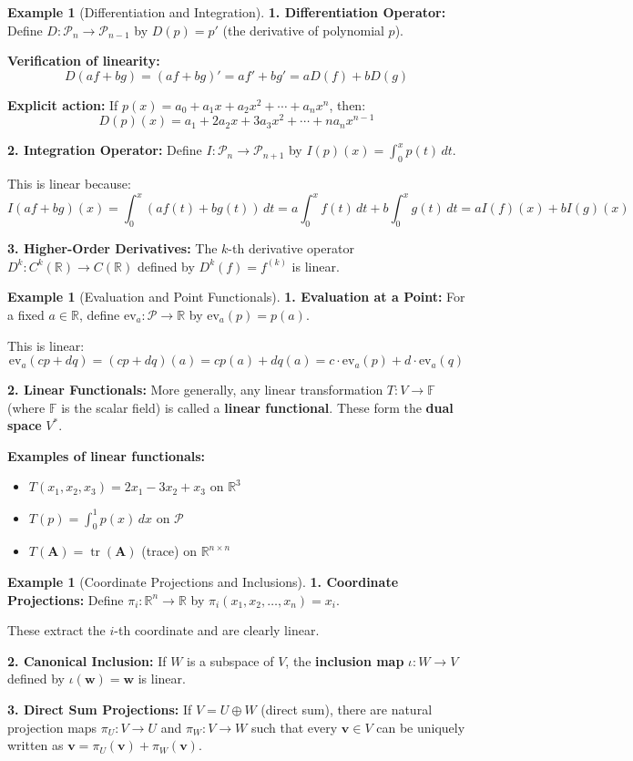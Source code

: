 \documentclass[12pt]{article}
\numberwithin{equation}{section}
\newcommand{\vect}[1]{\boldsymbol{#1}}   %
\newcommand{\mat}[1]{\mathbf{#1}}        %
\newcommand{\tr}{\operatorname{tr}}
\theoremstyle{plain}
\theoremstyle{definition}
\newtheorem{example}[theorem]{Example}
\theoremstyle{remark}
\begin{document}
\begin{example}[Differentiation and Integration]
\textbf{1. Differentiation Operator:}
Define $D: \mathcal{P}_n \to \mathcal{P}_{n-1}$ by $D(p) = p'$ (the derivative of polynomial $p$).

\textbf{Verification of linearity:}
$$D(af + bg) = (af + bg)' = af' + bg' = aD(f) + bD(g)$$

\textbf{Explicit action:} If $p(x) = a_0 + a_1x + a_2x^2 + \cdots + a_nx^n$, then:
$$D(p)(x) = a_1 + 2a_2x + 3a_3x^2 + \cdots + na_nx^{n-1}$$

\textbf{2. Integration Operator:}
Define $I: \mathcal{P}_n \to \mathcal{P}_{n+1}$ by $I(p)(x) = \int_0^x p(t) \, dt$.

This is linear because:
$$I(af + bg)(x) = \int_0^x (af(t) + bg(t)) \, dt = a\int_0^x f(t) \, dt + b\int_0^x g(t) \, dt = aI(f)(x) + bI(g)(x)$$

\textbf{3. Higher-Order Derivatives:}
The $k$-th derivative operator $D^k: C^k(\mathbb{R}) \to C(\mathbb{R})$ defined by $D^k(f) = f^{(k)}$ is linear.
\end{example}

\begin{example}[Evaluation and Point Functionals]
\textbf{1. Evaluation at a Point:}
For a fixed $a \in \mathbb{R}$, define $\text{ev}_a: \mathcal{P} \to \mathbb{R}$ by $\text{ev}_a(p) = p(a)$.

This is linear:
$$\text{ev}_a(cp + dq) = (cp + dq)(a) = cp(a) + dq(a) = c \cdot \text{ev}_a(p) + d \cdot \text{ev}_a(q)$$

\textbf{2. Linear Functionals:}
More generally, any linear transformation $T: V \to \mathbb{F}$ (where $\mathbb{F}$ is the scalar field) is called a \textbf{linear functional}. These form the \textbf{dual space} $V^*$.

\textbf{Examples of linear functionals:}
\begin{itemize}
\item $T(x_1, x_2, x_3) = 2x_1 - 3x_2 + x_3$ on $\mathbb{R}^3$
\item $T(p) = \int_0^1 p(x) \, dx$ on $\mathcal{P}$
\item $T(\mat{A}) = \tr(\mat{A})$ (trace) on $\mathbb{R}^{n \times n}$
\end{itemize}
\end{example}

\begin{example}[Coordinate Projections and Inclusions]
\textbf{1. Coordinate Projections:}
Define $\pi_i: \mathbb{R}^n \to \mathbb{R}$ by $\pi_i(x_1, x_2, \ldots, x_n) = x_i$.

These extract the $i$-th coordinate and are clearly linear.

\textbf{2. Canonical Inclusion:}
If $W$ is a subspace of $V$, the \textbf{inclusion map} $\iota: W \to V$ defined by $\iota(\vect{w}) = \vect{w}$ is linear.

\textbf{3. Direct Sum Projections:}
If $V = U \oplus W$ (direct sum), there are natural projection maps $\pi_U: V \to U$ and $\pi_W: V \to W$ such that every $\vect{v} \in V$ can be uniquely written as $\vect{v} = \pi_U(\vect{v}) + \pi_W(\vect{v})$.
\end{example}
\end{document}
